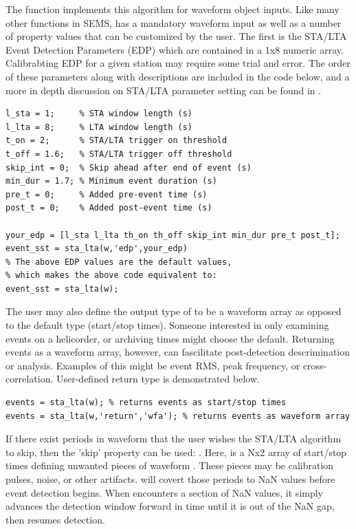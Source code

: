 \documentclass[11pt]{article}
\begin{document}
The function  implements this algorithm for waveform object inputs. Like many other functions in SEMS,  has a mandatory waveform input as well as a number of property values that can be customized by the user. The first is the STA/LTA Event Detection Parameters (EDP) which are contained in a 1x8 numeric array. Calibrabting EDP for a given station may require some trial and error. The order of these parameters along with descriptions are included in the code below, and a more in depth discussion on STA/LTA parameter setting can be found in \cite{trnkoczy-2002}.
\begin{lstlisting} 
l_sta = 1;     % STA window length (s)
l_lta = 8;     % LTA window length (s)
t_on = 2;      % STA/LTA trigger on threshold
t_off = 1.6;   % STA/LTA trigger off threshold
skip_int = 0;  % Skip ahead after end of event (s)
min_dur = 1.7; % Minimum event duration (s)
pre_t = 0;     % Added pre-event time (s) 
post_t = 0;    % Added post-event time (s)

your_edp = [l_sta l_lta th_on th_off skip_int min_dur pre_t post_t];
event_sst = sta_lta(w,'edp',your_edp) 
% The above EDP values are the default values,
% which makes the above code equivalent to:
event_sst = sta_lta(w); 
\end{lstlisting}

The user may also define the output type of  to be a waveform array as opposed to the default type (start/stop times). Someone interested in only examining events on a helicorder, or archiving times might choose the default. Returning events as a waveform array, however, can fascilitate post-detection descrimination or analysis. Examples of this might be event RMS, peak frequency, or cross-correlation. User-defined return type is demonstrated below.

\begin{lstlisting}
events = sta_lta(w); % returns events as start/stop times
events = sta_lta(w,'return','wfa'); % returns events as waveform array
\end{lstlisting}

\clearpage

If there exist periods in waveform  that the user wishes the STA/LTA algorithm to skip, then the 'skip' property can be used: . Here,  is a Nx2 array of start/stop times defining unwanted pieces of waveform . These pieces may be calibration pulses, noise, or other artifacts.  will covert those periods to NaN values before event detection begins. When  encounters a section of NaN values, it simply advances the detection window forward in time until it is out of the NaN gap, then resumes detection.
\end{document}

